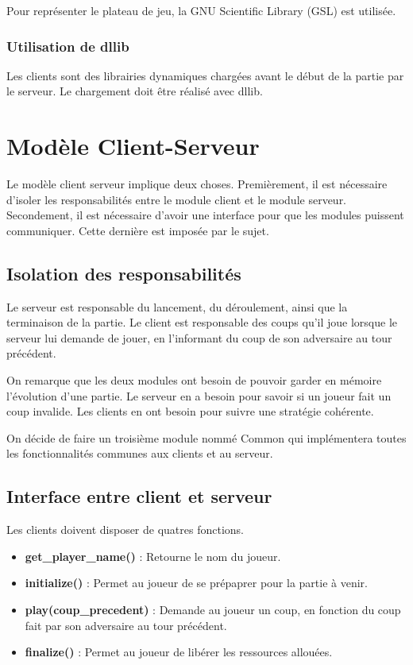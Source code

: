 \documentclass{article}
\begin{document}
Pour repr\'esenter le plateau de jeu, la GNU Scientific Library (GSL) est utilis\'ee.

\subsubsection{Utilisation de dllib}

Les clients sont des librairies dynamiques charg\'ees avant le début de la partie par le serveur.
Le chargement doit \^etre r\'ealis\'e avec dllib.

\section{Mod\`ele Client-Serveur}

Le mod\`ele client serveur implique deux choses.
Premi\`erement, il est n\'ecessaire d'isoler les responsabilit\'es entre le module client et le module serveur.
Secondement, il est n\'ecessaire d'avoir une interface pour que les modules puissent communiquer.
Cette derni\`ere est impos\'ee par le sujet.

\subsection{Isolation des responsabilit\'es}

Le serveur est responsable du lancement, du d\'eroulement, ainsi que la terminaison de la partie.
Le client est responsable des coups qu'il joue lorsque le serveur lui demande de jouer, 
en l'informant du coup de son adversaire au tour pr\'ec\'edent.

On remarque que les deux modules ont besoin de pouvoir garder en m\'emoire l'\'evolution d'une partie.
Le serveur en a besoin pour savoir si un joueur fait un coup invalide.
Les clients en ont besoin pour suivre une strat\'egie coh\'erente.

On d\'ecide de faire un troisi\`eme module nomm\'e Common qui impl\'ementera toutes les fonctionnalit\'es communes 
aux clients et au serveur.

\subsection{Interface entre client et serveur}

Les clients doivent disposer de quatres fonctions.
\begin{itemize}
    \item \textbf{get\_player\_name()} : Retourne le nom du joueur.
    \item \textbf{initialize()} : Permet au joueur de se pr\'epaprer pour la partie \`a venir.
    \item \textbf{play(coup\_precedent)} : Demande au joueur un coup, en fonction 
    du coup fait par son adversaire au tour pr\'ec\'edent.
    \item \textbf{finalize()} : Permet au joueur de lib\'erer les ressources allou\'ees.
\end{itemize}
\end{document}
